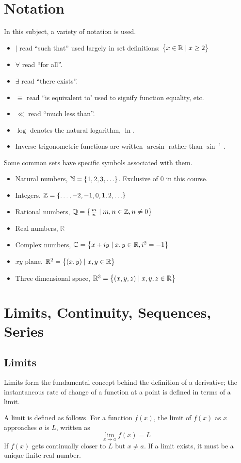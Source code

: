 \documentclass[12pt]{report}
\newcommand{\N}{\mathbb{N}}
\newcommand{\Z}{\mathbb{Z}}
\newcommand{\Q}{\mathbb{Q}}
\newcommand{\R}{\mathbb{R}}
\newcommand{\C}{\mathbb{C}}
\begin{document}
\begin{flushleft}

\section*{Notation}
In this subject, a variety of notation is used.
\begin{itemize}
    \item \(\mid\) read ``such that'' used largely in set definitions: 
        \(\set{x \in \R \mid x \geq 2}\)
    \item \(\forall\) read ``for all''.
    \item \(\exists\) read ``there exists''.
    \item \(\equiv\) read ``is equivalent to' used to signify function
        equality, etc.
    \item \(\ll\) read ``much less than''.
    \item \(\log\) denotes the natural logarithm, \(\ln\).
    \item Inverse trigonometric functions are written \(\arcsin\) rather than
        \(\sin^{-1}\).
\end{itemize}

Some common sets have specific symbols associated with them.
\begin{itemize}
    \item Natural numbers, \(\N = \set{1, 2, 3, \ldots}\). Exclusive of \(0\)
        in this course.
    \item Integers, \(\Z = \set{\ldots, -2, -1, 0, 1, 2, \ldots}\)
    \item Rational numbers, 
        \(\Q = \set{\frac{m}{n} \mid m, n \in \Z, n \neq 0}\)
    \item Real numbers, \(\R\)
    \item Complex numbers, \(\C = \set{x + iy \mid x, y \in \R, i^2 = -1}\)
    \item \(xy\) plane, \(\R^2 = \set{(x, y) \mid x, y \in \R}\)
    \item Three dimensional space, 
        \(\R^3 = \set{(x, y, z) \mid x, y, z \in \R}\)
\end{itemize}

\section*{Limits, Continuity, Sequences, Series}
\subsection*{Limits}
Limits form the fundamental concept behind the definition of a derivative;
the instantaneous rate of change of a function at a point is defined in terms
of a limit. \par
A limit is defined as follows. For a function \(f(x)\), the limit of \(f(x)\) 
as \(x\) approaches \(a\) is \(L\), written as
\[\lim_{x\rightarrow a}f(x) = L\]
If \(f(x)\) gets continually closer to \(L\) but \(x \neq a\). If a limit 
exists, it must be a unique finite real number.


\end{flushleft}
\end{document}
